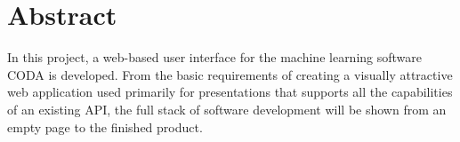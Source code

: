 \chapter*{Abstract}
In this project, a web-based user interface for the machine learning software CODA is developed. From the basic requirements of creating a visually attractive web application used primarily for presentations that supports all the capabilities of an existing API, the full stack of software development will be shown from an empty page to the finished product.
